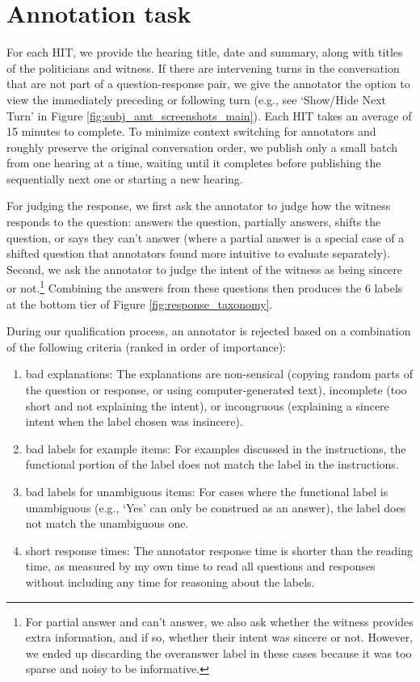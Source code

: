 \section{Annotation task}
\label{sec:app_anno}

For each HIT, we provide the hearing title, date and summary, along with titles of the politicians and witness. If there are intervening turns in the conversation that are not part of a question-response pair, we give the annotator the option to view the immediately preceding or following turn (e.g., see `Show/Hide Next Turn' in Figure \ref{fig:subj_amt_screenshots_main}). Each HIT takes an average of 15 minutes to complete. To minimize context switching for annotators and roughly preserve the original conversation order, we publish only a small batch from one hearing at a time, waiting until it completes before publishing the sequentially next one or starting a new hearing.

For judging the response, we first ask the annotator to judge how the witness responds to the question: answers the question, partially answers, shifts the question, or says they can't answer (where a partial answer is a special case of a shifted question that annotators found more intuitive to evaluate separately). Second, we ask the annotator to judge the intent of the witness as being sincere or not.\footnote{For partial answer and can't answer, we also ask whether the witness provides extra information, and if so, whether their intent was sincere or not. However, we ended up discarding the overanswer label in these cases because it was too sparse and noisy to be informative.} Combining the answers from these questions then produces the 6 labels at the bottom tier of Figure \ref{fig:response_taxonomy}. 

During our qualification process, an annotator is rejected based on a combination of the following criteria (ranked in order of importance):
\begin{enumerate}[label=(\roman*)]
\item bad explanations: The explanations are non-sensical (copying random parts of the question or response, or using computer-generated text), incomplete (too short and not explaining the intent), or incongruous (explaining a sincere intent when the label chosen was insincere).
\item bad labels for example items: For examples discussed in the instructions, the functional portion of the label does not match the label in the instructions. 
\item bad labels for unambiguous items: For cases where the functional label is unambiguous (e.g., `Yes' can only be construed as an answer), the label does not match the unambiguous one. 
\item short response times: The annotator response time is shorter than the reading time, as measured by my own time to read all questions and responses without including any time for reasoning about the labels.
\end{enumerate} 

